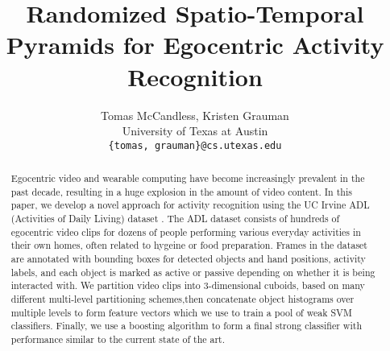\documentclass[10pt,twocolumn,letterpaper]{article}
\begin{document}
\title{Randomized Spatio-Temporal Pyramids for Egocentric Activity Recognition}

\author{Tomas McCandless, Kristen Grauman\\
University of Texas at Austin\\
{\tt\small \{tomas, grauman\}@cs.utexas.edu}
}

\maketitle

\begin{abstract}
	Egocentric video and wearable computing have become increasingly
	prevalent in the past decade, resulting in a huge explosion in the amount
	of video content. In this paper, we develop a novel approach for
	activity recognition using the UC Irvine ADL (Activities of Daily Living)
	dataset \cite{Ramanan12}. The ADL dataset consists of hundreds of egocentric video clips
	for dozens of people performing various everyday activities in their own
	homes, often related to hygeine or food preparation. Frames in the dataset
	are annotated with bounding boxes for detected objects and hand positions, 
	activity labels, and each object is marked as active or passive depending
	on whether it is being interacted with. We partition video clips into
	3-dimensional cuboids, based on many different multi-level partitioning
	schemes,then concatenate object histograms
	over multiple levels to form feature vectors which we use to train a pool
	of weak SVM classifiers. Finally, we use a boosting algorithm to form a
	final strong classifier with performance similar to the current state of
	the art.
\end{abstract}

\end{document}
